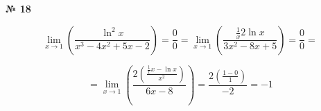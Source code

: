 \documentclass{article}
\begin{document}
\textbf{№ 18} 

\begingroup
\Large

$$ \lim\limits_{x \to 1} \left( \frac{\ln^2{x}}{x^3-4x^2+5x-2} \right)
= \frac{0}{0} 
=  \lim\limits_{x \to 1} \left( \frac{\frac{1}{x} 2 \ln{x}}{3x^2-8x+5} \right)
= \frac{0}{0} 
= $$

$$ = \lim\limits_{x \to 1} \left( \frac{2 \left( \frac{\frac{1}{x} x - \ln{x}}{x^2}\right) }{6x-8} \right)
= \frac{2 \left( \frac{1-0}{1} \right)}{-2}
= -1 $$

\endgroup
\end{document}
